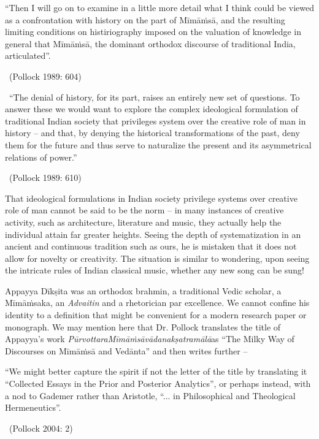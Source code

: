 \begin{myquote}
“Then I will go on to examine in a little more detail what I think could be viewed as a confrontation with history on the part of Mīmāṁsā, and the resulting limiting conditions on histiriography imposed on the valuation of knowledge in general that Mīmāṁsā, the dominant orthodox discourse of traditional India, articulated”. 

~\hfill (Pollock 1989: 604)
\end{myquote}


~\hfill “The denial of history, for its part, raises an entirely new set of questions. To answer these we would want to explore the complex ideological formulation of traditional Indian society that privileges system over the creative role of man in history – and that, by denying the historical transformations of the past, deny them for the future and thus serve to naturalize the present and its asymmetrical relations of power.” 

~\hfill (Pollock 1989: 610)

That ideological formulations in Indian society privilege systems over creative role of man cannot be said to be the norm – in many instances of creative activity, such as architecture, literature and music, they actually help the individual attain far greater heights. Seeing the depth of systematization in an ancient and continuous tradition such as ours, he is mistaken that it does not allow for novelty or creativity. The situation is similar to wondering, upon seeing the intricate rules of Indian classical music, whether any new song can be sung! 

Appayya Dīkṣita was an orthodox brahmin, a traditional Vedic scholar, a Mīmāṁsaka, an \textit{Advaitin} and a rhetorician par excellence. We cannot confine his identity to a definition that might be convenient for a modern research paper or monograph. We may mention here that Dr. Pollock translates the title of Appayya’s work \textit{PūrvottaraMīmāṁsāvādanakṣatramālā}as “The Milky Way of Discourses on Mīmāṁsā and Vedānta” and then writes further –

\begin{myquote}
“We might better capture the spirit if not the letter of the title by translating it “Collected Essays in the Prior and Posterior Analytics”, or perhaps instead, with a nod to Gademer rather than Aristotle, “... in Philosophical and Theological Hermeneutics”. 

~\hfill (Pollock 2004: 2)
\end{myquote}

